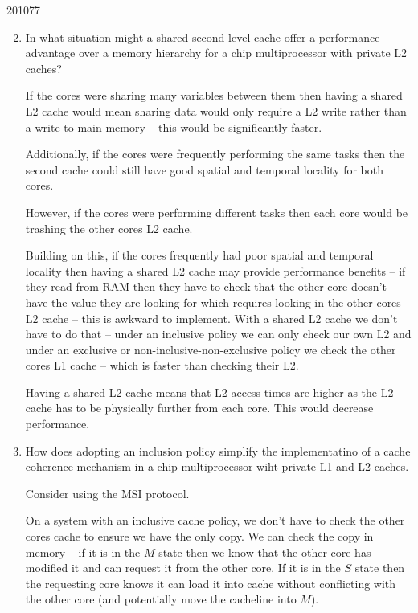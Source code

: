\documentclass[10pt,\jkfside,a4paper]{article}
\begin{document}
\begin{examquestion}{2010}{7}{7}

\begin{enumerate}[label=(\alph*)]

\setcounter{enumi}{1}

\item In what situation might a shared second-level cache offer a
performance advantage over a memory hierarchy for a chip multiprocessor with
private L2 caches?

If the cores were sharing many variables between them then having a shared
L2 cache would mean sharing data would only require a L2 write rather than a
write to main memory -- this would be significantly faster.

Additionally, if the cores were frequently performing the same tasks then
the second cache could still have good spatial and temporal locality for
both cores.

However, if the cores were performing different tasks then each core would
be trashing the other cores L2 cache.

Building on this, if the cores frequently had poor spatial and
temporal locality then having a shared L2 cache may provide performance
benefits -- if they read from RAM then they have to check that the other
core doesn't have the value they are looking for which requires looking in
the other cores L2 cache -- this is awkward to implement. With a shared L2
cache we don't have to do that -- under an inclusive policy we can only
check our own L2 and under an exclusive or non-inclusive-non-exclusive
policy we check the other cores L1 cache -- which is faster than checking
their L2.

Having a shared L2 cache means that L2 access times are higher as the L2
cache has to be physically further from each core. This would decrease
performance.

\setcounter{enumi}{3}

\item How does adopting an inclusion policy simplify the implementatino of a
cache coherence mechanism in a chip multiprocessor wiht private L1 and L2
caches.

Consider using the MSI protocol.

On a system with an inclusive cache policy, we don't have to check the other
cores cache to ensure we have the only copy. We can check the copy in memory
-- if it is in the $M$ state then we know that the other core has modified
it and can request it from the other core. If it is in the $S$ state then
the requesting core knows it can load it into cache without conflicting with
the other core (and potentially move the cacheline into $M$).


\end{enumerate}
\end{examquestion}
\end{document}
